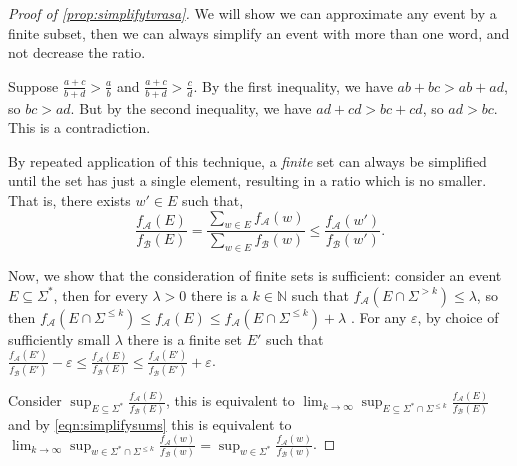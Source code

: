 \documentclass{lmcs}
\theoremstyle{plain}
\theoremstyle{definition}
\theoremstyle{remark}
\begin{document}
\begin{proof}[Proof of \cref{prop:simplifytvrasa}]
We will show we can approximate any event by a finite subset, then we can always simplify an event with more than one word, and not decrease the ratio.

Suppose $\frac{a+c}{b+d} > \frac{a}{b}$ and $\frac{a+c}{b+d} > \frac{c}{d}$.
By the first inequality, we have $ab + bc > ab + ad$, so $bc > ad$. But by the second inequality, we have $ad+cd > bc +cd$, so $ad > bc$. This is a contradiction.

By repeated application of this technique, a \emph{finite} set can always be simplified until the set has just a single element, resulting in a ratio which is no smaller.  That is, there exists $w'\in E$ such that,
\begin{equation}\label{eqn:simplifysums} \frac{f_{\mathcal A}(E) }{ f_{\mathcal B}(E)} =  \frac{\sum_{w\in E}f_{\mathcal A}(w)}{\sum_{w\in E}f_{\mathcal B}(w)} \le \frac{f_{\mathcal A}(w')}{f_{\mathcal B}(w')}.\end{equation}

Now, we show that the consideration of finite sets is sufficient: consider an event $E\subseteq\Sigma^*$, then for every $\lambda > 0 $ there is a $k\in\mathbb{N}$ such that $f_{\mathcal{A}}(E\cap \Sigma^{>k}) \le \lambda$, so then $f_{\mathcal{A}}(E\cap \Sigma^{\le k}) \le f_{\mathcal{A}}(E) \le f_{\mathcal{A}}(E\cap \Sigma^{\le k}) + \lambda$ \cite[Lemma 12]{kiefer2018computing}. For any $\varepsilon$, by choice of sufficiently small $\lambda$ there is a finite set $E'$ such that  $\frac{f_{\mathcal{A}}(E')}{f_{\mathcal{B}}(E')} - \varepsilon \le  \frac{f_{\mathcal{A}}(E)}{f_{\mathcal{B}}(E)} \le \frac{f_{\mathcal{A}}(E')}{f_{\mathcal{B}}(E')} +  \varepsilon$.

Consider $\sup_{E \subseteq \Sigma^*} \frac{f_{\mathcal{A}}(E)}{f_{\mathcal{B}}(E)} $, this is equivalent to $\lim_{k\to\infty}\sup_{E\subseteq \Sigma^* \cap \Sigma^{\le k}}\frac{f_{\mathcal{A}}(E)}{f_{\mathcal{B}}(E)} $ and by \cref{eqn:simplifysums} this is equivalent to $\lim_{k\to\infty}\sup_{w\in \Sigma^* \cap \Sigma^{\le k}}\frac{f_{\mathcal{A}}(w)}{f_{\mathcal{B}}(w)} =\sup_{w\in \Sigma^*}\frac{f_{\mathcal{A}}(w)}{f_{\mathcal{B}}(w)} $.\end{proof}
\end{document}
